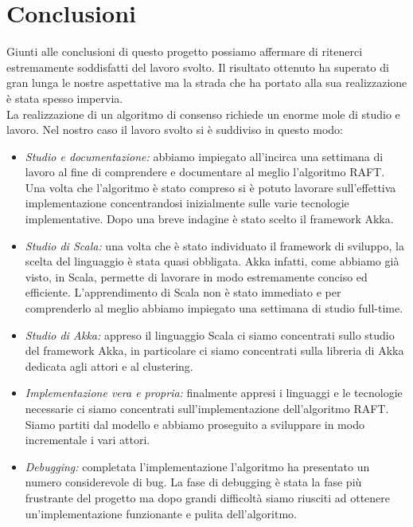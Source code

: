\chapter{Conclusioni}
Giunti alle conclusioni di questo progetto possiamo affermare di ritenerci estremamente soddisfatti del lavoro svolto. Il risultato ottenuto ha superato di gran lunga le nostre aspettative ma la strada che ha portato alla sua realizzazione è stata spesso impervia.\\
La realizzazione di un algoritmo di consenso richiede un enorme mole di studio e lavoro. Nel nostro caso il lavoro svolto si è suddiviso in questo modo: 
\begin{itemize}
  \item{\emph{Studio e documentazione:}}
  abbiamo impiegato all'incirca una settimana di lavoro al fine di comprendere e documentare al meglio l'algoritmo RAFT. Una volta che l'algoritmo è stato compreso si è potuto lavorare sull'effettiva implementazione concentrandosi inizialmente sulle varie tecnologie implementative. Dopo una breve indagine è stato scelto il framework Akka.
  \item{\emph{Studio di Scala:}}
  una volta che è stato individuato il framework di sviluppo, la scelta del linguaggio è stata quasi obbligata. Akka infatti, come abbiamo già visto, in Scala, permette di lavorare in modo estremamente conciso ed efficiente. L'apprendimento di Scala non è stato immediato e per comprenderlo al meglio abbiamo impiegato una settimana di studio full-time.
  \item{\emph{Studio di Akka:}}
  appreso il linguaggio Scala ci siamo concentrati sullo studio del framework Akka, in particolare ci siamo concentrati sulla libreria di Akka dedicata agli attori e al clustering.
  \item{\emph{Implementazione vera e propria:}}
  finalmente appresi i linguaggi e le tecnologie necessarie ci siamo concentrati sull'implementazione dell'algoritmo RAFT. Siamo partiti dal modello e abbiamo proseguito a sviluppare in modo incrementale i vari attori.
  \item{\emph{Debugging:}}
  completata l'implementazione l'algoritmo ha presentato un numero considerevole di bug. La fase di debugging è stata la fase più frustrante del progetto ma dopo grandi difficoltà siamo riusciti ad ottenere un'implementazione funzionante e pulita dell'algoritmo.
\end{itemize}



